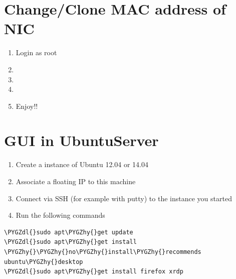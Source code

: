 \documentclass[letterpaper,10pt,english]{sphinxmanual}
\def\PYGZdl{\char`\$}
\def\PYGZhy{\char`\-}
\begin{document}
\section{Change/Clone MAC address of NIC}
\label{_source/things/change_MAC::doc}\label{_source/things/change_MAC:change-clone-mac-address-of-nic}\begin{enumerate}
\item {} 
Login as root

\item {} 

\item {} 

\item {} 

\item {} 
Enjoy!!

\end{enumerate}


\section{GUI in UbuntuServer}
\label{_source/things/gui_in_ubuntu_server:gui-in-ubuntuserver}\label{_source/things/gui_in_ubuntu_server::doc}\begin{enumerate}
\item {} 
Create a instance of Ubuntu 12.04 or 14.04

\item {} 
Associate a floating IP to this machine

\item {} 
Connect via SSH (for example with putty) to the instance you started

\item {} 
Run the following commands

\end{enumerate}

\begin{Verbatim}[commandchars=\\\{\}]
\PYGZdl{}sudo apt\PYGZhy{}get update
\PYGZdl{}sudo apt\PYGZhy{}get install \PYGZhy{}\PYGZhy{}no\PYGZhy{}install\PYGZhy{}recommends ubuntu\PYGZhy{}desktop
\PYGZdl{}sudo apt\PYGZhy{}get install firefox xrdp
\end{Verbatim}
\end{document}
